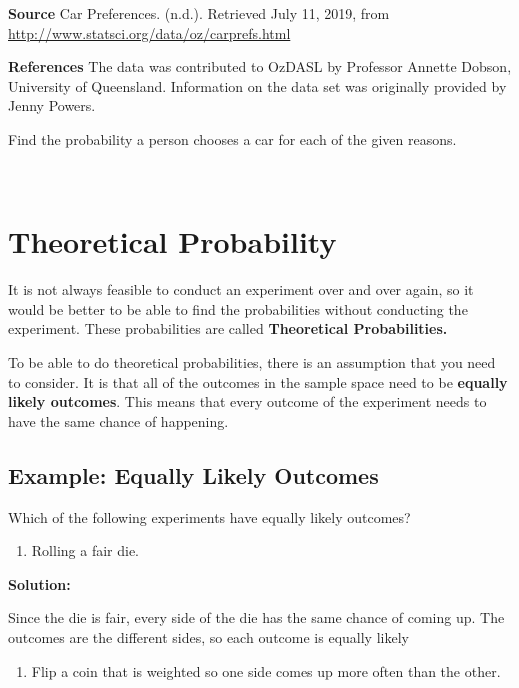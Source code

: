 \documentclass[]{book}
\providecommand{\tightlist}{%
  \setlength{\itemsep}{0pt}\setlength{\parskip}{0pt}}
\begin{document}
\textbf{Source}
Car Preferences. (n.d.). Retrieved July 11, 2019, from \url{http://www.statsci.org/data/oz/carprefs.html}

\textbf{References}
The data was contributed to OzDASL by Professor Annette Dobson, University of Queensland. Information on the data set was originally provided by Jenny Powers.

Find the probability a person chooses a car for each of the given reasons.

\textbf{\\
}

\hypertarget{theoretical-probability}{%
\section{Theoretical Probability}\label{theoretical-probability}}

It is not always feasible to conduct an experiment over and over again, so it would be better to be able to find the probabilities without conducting the experiment. These probabilities are called \textbf{Theoretical Probabilities.}

To be able to do theoretical probabilities, there is an assumption that you need to consider. It is that all of the outcomes in the sample space need to be \textbf{equally likely outcomes}. This means that every outcome of the experiment needs to have the same chance of happening.

\hypertarget{example-equally-likely-outcomes}{%
\subsection{Example: Equally Likely Outcomes}\label{example-equally-likely-outcomes}}

Which of the following experiments have equally likely outcomes?

\begin{enumerate}
\def\labelenumi{\alph{enumi}.}
\tightlist
\item
  Rolling a fair die.
\end{enumerate}

\textbf{Solution:}

Since the die is fair, every side of the die has the same chance of coming up. The outcomes are the different sides, so each outcome is equally likely

\begin{enumerate}
\def\labelenumi{\alph{enumi}.}
\setcounter{enumi}{1}
\tightlist
\item
  Flip a coin that is weighted so one side comes up more often than the other.
\end{enumerate}
\end{document}
